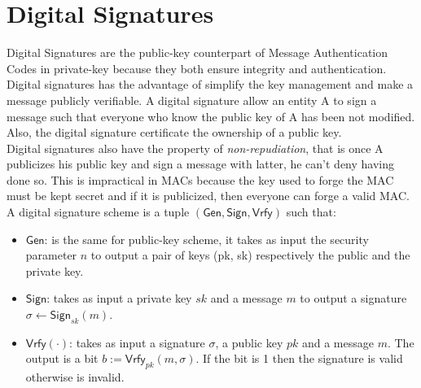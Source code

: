 \section{Digital Signatures}
Digital Signatures are the public-key counterpart of Message Authentication Codes in private-key because they both ensure integrity and authentication. Digital signatures has the advantage of simplify the key management and make a message publicly verifiable.
A digital signature allow an entity A to sign a message such that everyone who know the public key of A has been not modified. Also, the digital signature certificate the ownership of a public key.\\
Digital signatures also have the property of \emph{non-repudiation}, that is once A publicizes his public key and sign a message with latter, he can't deny having done so. This is impractical in MACs because the key used to forge the MAC must be kept secret and if it is publicized, then everyone can forge a valid MAC.\\
A digital signature scheme is a tuple $(\mathsf{Gen}, \mathsf{Sign}, \mathsf{Vrfy})$ such that:
\begin{itemize}
    \item{$\mathsf{Gen}$}: is the same for public-key scheme, it takes as input the security parameter $n$ to output a pair of keys (pk, sk) respectively the public and the private key.
    \item{$\mathsf{Sign}$}: takes as input a private key $sk$ and a message $m$ to output a signature $\sigma \leftarrow \mathsf{Sign}_{sk}(m)$.
    \item{$\mathsf{Vrfy}(\cdot)$}: takes as input a signature $\sigma$, a public key $pk$ and a message $m$. The output is a bit $b := \mathsf{Vrfy}_{pk}(m, \sigma)$. If the bit is 1 then the signature is valid otherwise is invalid.
\end{itemize}

